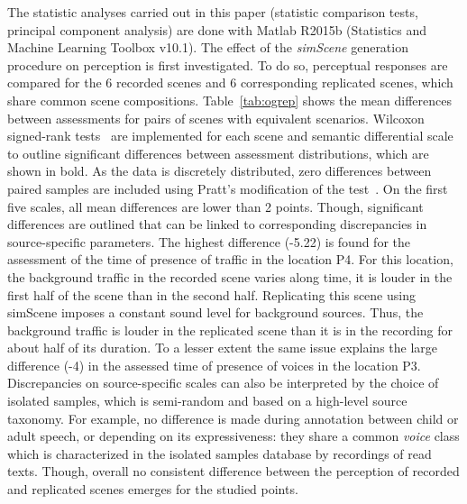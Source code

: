 \documentclass[twocolumn]{article}
\begin{document}
The statistic analyses carried out in this paper (statistic comparison tests, principal component analysis) are done with Matlab R2015b (Statistics and Machine Learning Toolbox v10.1). The effect of the \textit{simScene} generation procedure on perception is first investigated. To do so, perceptual responses are compared for the 6 recorded scenes and 6 corresponding replicated scenes, which share common scene compositions. Table~\ref{tab:ogrep} shows the mean differences between assessments for pairs of scenes with equivalent scenarios. Wilcoxon signed-rank tests~\cite{wilcoxon1945} are implemented for each scene and semantic differential scale to outline significant differences between assessment distributions, which are shown in bold. As the data is discretely distributed, zero differences between paired samples are included using Pratt's modification of the test~\cite{pratt1959}. On the first five scales, all mean differences are lower than 2 points. Though, significant differences are outlined that can be linked to corresponding discrepancies in source-specific parameters. The highest difference (-5.22) is found for the assessment of the time of presence of traffic in the location P4. For this location, the background traffic in the recorded scene varies along time, it is louder in the first half of the scene than in the second half. Replicating this scene using simScene imposes a constant sound level for background sources. Thus, the background traffic is louder in the replicated scene than it is in the recording for about half of its duration. To a lesser extent the same issue explains the large difference (-4) in the assessed time of presence of voices in the location P3. Discrepancies on source-specific scales can also be interpreted by the choice of isolated samples, which is semi-random and based on a high-level source taxonomy. For example, no difference is made during annotation between child or adult speech, or depending on its expressiveness: they share a common \textit{voice} class which is characterized in the isolated samples database by recordings of read texts. Though, overall no consistent difference between the perception of recorded and replicated scenes emerges for the studied points.
\end{document}
